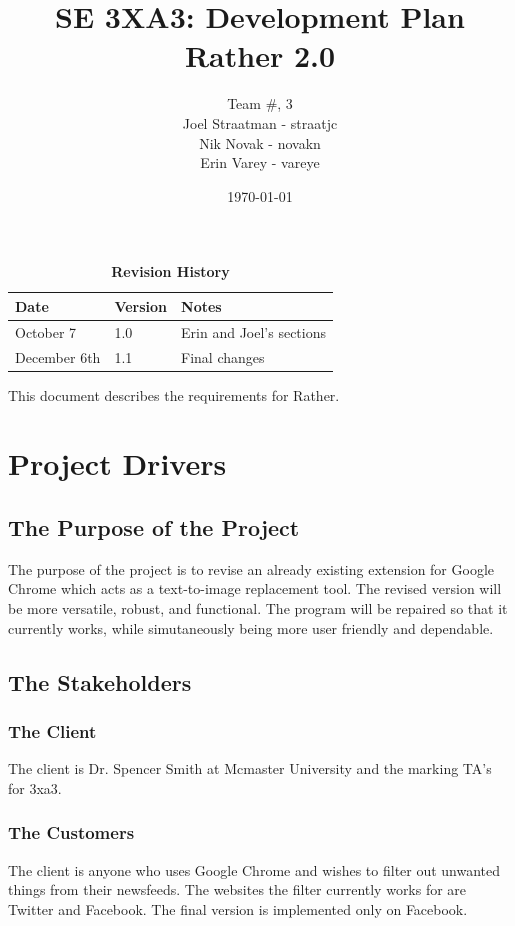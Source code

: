 \documentclass[12pt, titlepage]{article}
\title{SE 3XA3: Development Plan\\Rather 2.0}  %
\author{Team \#, 3  %
		\\ Joel Straatman - straatjc
		\\ Nik Novak - novakn
		\\ Erin Varey - vareye
}
\date{\today}
\begin{document}
\maketitle

\tableofcontents
\listoftables
\listoffigures

\begin{table}[bp]
\caption{\bf Revision History}
\begin{tabularx}{\textwidth}{p{3cm}p{2cm}X}
\toprule {\bf Date} & {\bf Version} & {\bf Notes}\\
\midrule
October 7 & 1.0 &  Erin and Joel's sections\\
December 6th & 1.1 & Final changes\\
\bottomrule
\end{tabularx}
\end{table}

\newpage


This document describes the requirements for Rather. 
\section{Project Drivers}

\subsection{The Purpose of the Project}
The purpose of the project is to revise an already existing extension for Google Chrome which acts as a text-to-image replacement tool. The revised version will be more versatile, robust, and functional. The program will be repaired so that it currently works, while simutaneously being more user friendly and dependable. 

\subsection{The Stakeholders}

\subsubsection{The Client}
The client is Dr. Spencer Smith at Mcmaster University and the marking TA's for 3xa3. %

\subsubsection{The Customers}
The client is anyone who uses Google Chrome and wishes to filter out unwanted things from their newsfeeds. The websites the filter currently works for are Twitter and Facebook. The final version is implemented only on Facebook.
\end{document}
